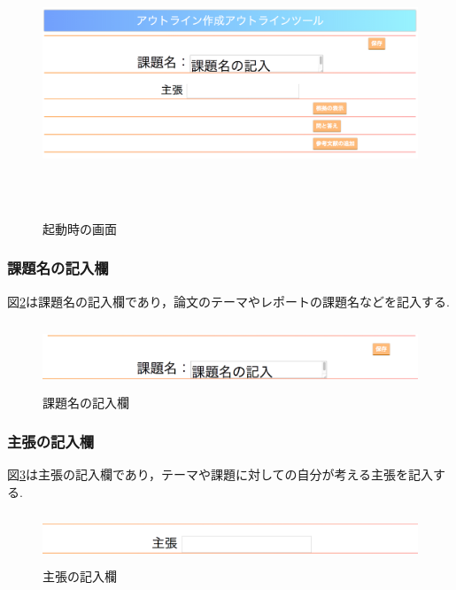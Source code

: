 \documentclass[a4j,12pt]{jarticle}
\begin{document}
\begin{figure}[h]
\begin{center}
 \includegraphics[clip,width=150mm,height=80mm]{figure/10outline.png}
\end{center}
 \caption{起動時の画面}
 \label{fig:r}
\end{figure}

\newpage
\subsubsection{課題名の記入欄}
図\ref{fig:h}は課題名の記入欄であり，論文のテーマやレポートの課題名などを記入する.
\begin{figure}[h]
\begin{center}
 \includegraphics[clip,width=150mm,height=20mm]{figure/00kadai.png}
\end{center}
 \caption{課題名の記入欄}
 \label{fig:h}
\end{figure}

\subsubsection{主張の記入欄}
図\ref{fig:i}は主張の記入欄であり，テーマや課題に対しての自分が考える主張を記入する.
\begin{figure}[h]
\begin{center}
 \includegraphics[clip,width=150mm,height=15mm]{figure/01shucho.png}
\end{center}
 \caption{主張の記入欄}
 \label{fig:i}
\end{figure}
\end{document}
